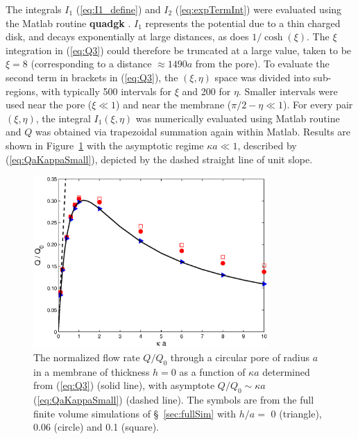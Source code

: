 The integrals $I_1$ (\ref{eq:I1_define}) and $I_2$ (\ref{eq:expTermInt}) were evaluated using the Matlab routine \textbf{quadgk} \cite{matlab}. $I_1$ represents the potential due to a thin charged disk,
and decays exponentially at large distances, as does $1/\cosh(\xi)$. The $\xi$ integration in
(\ref{eq:Q3}) could therefore be truncated at a large value, taken to be $\xi=8$
(corresponding to a distance $\approx 1490a$ from the pore). To evaluate the second term in brackets in (\ref{eq:Q3}), the $(\xi,\eta)$ space was divided into sub-regions, with typically 500 intervals for $\xi$ and 200 for $\eta$. Smaller intervals were used near the pore ($\xi\ll 1$) and near
the membrane ($\pi/2-\eta\ll 1$). For every pair $(\xi,\eta)$, the integral $I_1(\xi,\eta)$ was numerically
evaluated using Matlab routine and $Q$ was obtained via trapezoidal summation again within Matlab. Results are shown in Figure~\ref{fig:QaKappa} with the asymptotic regime $\kappa a \ll 1$, described by (\ref{eq:QaKappaSmall}), depicted by the dashed straight line of unit slope. 

\begin{figure}[h]
\centering
\includegraphics[width = 0.8\textwidth]{zero_thickness/figure2.eps}
\caption{The normalized flow rate $Q/Q_0$ through a circular pore of radius $a$ 
in a membrane of thickness $h=0$ as a function of $\kappa a$ determined from (\ref{eq:Q3})  (solid line), with asymptote $Q/Q_{0} \sim \kappa a$ (\ref{eq:QaKappaSmall}) (dashed line). The symbols are from the full finite volume simulations of \S~\ref{sec:fullSim} with $h/a=$ 0 (triangle), 0.06 (circle) 
and 0.1 (square).}
\label{fig:QaKappa}
\end{figure}

